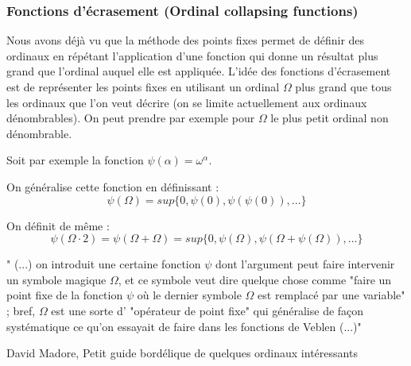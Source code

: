 \documentclass[12pt]{beamer}
\begin{document}
\begin{frame}

\frametitle{Fonctions d'écrasement (Ordinal collapsing functions)}

Nous avons déjà vu que la méthode des points fixes permet de définir des ordinaux en répétant l'application d'une fonction qui donne un résultat plus grand que l'ordinal auquel elle est appliquée.
L'idée des fonctions d'écrasement est de représenter les points fixes en utilisant un ordinal \( \Omega \) plus grand que tous les ordinaux que l'on veut décrire (on se limite actuellement aux ordinaux dénombrables). On peut prendre par exemple pour \( \Omega \) le plus petit ordinal non dénombrable.

\end{frame}
\begin{frame}

Soit par exemple la fonction \( \psi(\alpha) = \omega^\alpha \).

On généralise cette fonction en définissant :
\[ \psi(\Omega) = sup \lbrace 0, \psi(0), \psi(\psi(0)), \ldots \rbrace \]

On définit de même :
\[ \psi(\Omega \cdot 2) = \psi(\Omega+\Omega) = sup \lbrace 0, \psi(\Omega), \psi(\Omega+\psi(\Omega)), \ldots \rbrace \]

" (...) on introduit une certaine fonction $\psi$  dont l'argument peut faire intervenir un symbole magique $\Omega$, et ce symbole veut dire quelque chose comme "faire un point fixe de la fonction $\psi$ où le dernier symbole $\Omega$ est remplacé par une variable" ; bref, $\Omega$ est une sorte d' "opérateur de point fixe" qui généralise de façon systématique ce qu'on essayait de faire dans les fonctions de Veblen (...)"

David Madore, Petit guide bordélique de quelques ordinaux intéressants

\end{frame}
\end{document}
